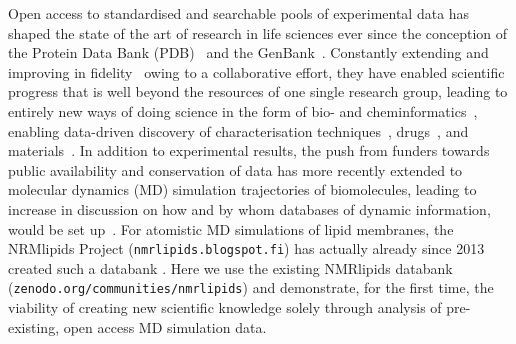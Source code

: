 \documentclass[journal=jpcbfk,manuscript=article,layout=twocolumn]{achemso}
\begin{document}
Open access to standardised and searchable pools of experimental data
has shaped the state of the art of research in life sciences
ever since the conception of the Protein Data Bank (PDB)~\cite{nnb1971,wwPDB2019} and the GenBank~\cite{jordan1982,sayers2020}.
Constantly extending and improving in fidelity~\cite{hobohm1992,levitt2007,meszaros2019}
owing to a collaborative effort, they have enabled scientific progress that is well beyond the resources of one single research group, leading to entirely new ways of doing science in the form of bio- and cheminformatics~\cite{Gaber:2019a}, enabling data-driven discovery of 
characterisation techniques~\cite{burley2018}, %
drugs~\cite{kirchmair08}, and materials~\cite{huang2016}.
%
%
In addition to experimental results, the push from %
funders towards public availability and conservation of data has more recently extended to molecular dynamics (MD) simulation trajectories of biomolecules, leading to increase in discussion on how and by whom databases of dynamic information, would be set up~\cite{Hildebrand:2019a,Abraham:2019a,Gygli:2020a,Abriata:2020a,Hospital:2020a}.
%
For atomistic MD simulations of lipid membranes,
the NRMlipids Project ({\tt nmrlipids.blogspot.fi}) has actually already since 2013 created such a databank \cite{BPS2018}.
Here we use the existing NMRlipids databank
({\tt zenodo.org/communities/nmrlipids})
and demonstrate, for the first time, the viability of creating new scientific knowledge solely through analysis of pre-existing, open access MD simulation data.
\end{document}
